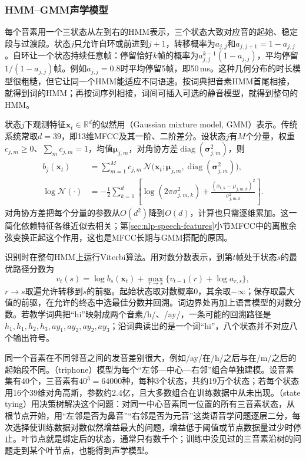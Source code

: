 \subsubsection{HMM--GMM声学模型}
\label{sec:nlp-speech-hmm-gmm}

每个音素用一个三状态从左到右的HMM表示，三个状态大致对应音的起始、稳定段与过渡段。状态$j$只允许自环或前进到$j+1$，转移概率为$a_{j,j}$和$a_{j,j+1}=1-a_{j,j}$。自环让一个状态持续任意帧：停留恰好$k$帧的概率为$a_{j,j}^{k-1}(1-a_{j,j})$，平均停留$1/(1-a_{j,j})$帧。例如$a_{j,j}=0.8$时平均停留5帧，即50\,ms。这种几何分布的时长模型很粗糙，但它让同一个HMM能适应不同语速。按词典把音素HMM首尾相接，就得到词的HMM；再按词序列相接，词间可插入可选的静音模型，就得到整句的HMM。

状态$j$下观测特征$\bm{x}_t\in\mathbb{R}^{d}$的似然用（Gaussian mixture model, GMM）表示。传统系统常取$d=39$，即13维MFCC及其一阶、二阶差分。设状态$j$有$M$个分量，权重$c_{j,m}\geq0$、$\sum_mc_{j,m}=1$，均值$\bm{\mu}_{j,m}$，对角协方差$\operatorname{diag}(\bm{\sigma}_{j,m}^2)$，则
\begin{equation}
\begin{aligned}
 b_j(\bm{x}_t)&=\sum_{m=1}^{M}c_{j,m}\,
   \mathcal{N}\bigl(\bm{x}_t;\bm{\mu}_{j,m},\operatorname{diag}(\bm{\sigma}_{j,m}^2)\bigr),\\
 \log\mathcal{N}(\cdot)&=-\frac12\sum_{k=1}^{d}
   \left[\log(2\pi\sigma_{j,m,k}^2)+\frac{(x_{t,k}-\mu_{j,m,k})^2}{\sigma_{j,m,k}^2}\right].
\end{aligned}
\label{eq:nlp-speech-gmm}
\end{equation}
对角协方差把每个分量的参数从$O(d^2)$降到$O(d)$，计算也只需逐维累加。这一简化依赖特征各维近似去相关；第\ref{sec:nlp-speech-features}小节MFCC中的离散余弦变换正起这个作用，这也是MFCC长期与GMM搭配的原因。

识别时在整句HMM上运行Viterbi算法。用对数分数表示，到第$t$帧处于状态$s$的最优路径分数为
\begin{equation}
 v_t(s)=\log b_s(\bm{x}_t)+
       \max_{r\to s}\{v_{t-1}(r)+\log a_{r,s}\},
 \label{eq:nlp-speech-hmm-viterbi}
\end{equation}
$r\to s$取遍允许转移到$s$的前驱。起始状态取对数概率0，其余取$-\infty$；保存取最大值的前驱，在允许的终态中选最佳分数并回溯。词边界处再加上语言模型的对数分数。若教学词典把“hi”映射成两个音素/h/、/ay/，一条可能的回溯路径是$h_1,h_1,h_2,h_3,ay_1,ay_2,ay_2,ay_3$；沿词典读出的是一个词“hi”，八个状态并不对应八个输出符号。

同一个音素在不同邻音之间的发音差别很大，例如/ay/在/h/之后与在/m/之后的起始段不同。（triphone）模型为每个“左邻—中心—右邻”组合单独建模。设音素集有40个，三音素有$40^3=64000$种，每种3个状态，共约19万个状态；若每个状态用16个39维对角高斯，参数约2.4亿，且大多数组合在训练数据中从未出现。（state tying）用决策树解决这个问题：对同一中心音素同一位置的所有三音素状态，从根节点开始，用“左邻是否为鼻音”“右邻是否为元音”这类语音学问题逐层二分，每次选择使训练数据对数似然增益最大的问题，增益低于阈值或节点数据量过少时停止。叶节点就是绑定后的状态，通常只有数千个；训练中没见过的三音素沿树的问题走到某个叶节点，也能得到声学模型。


